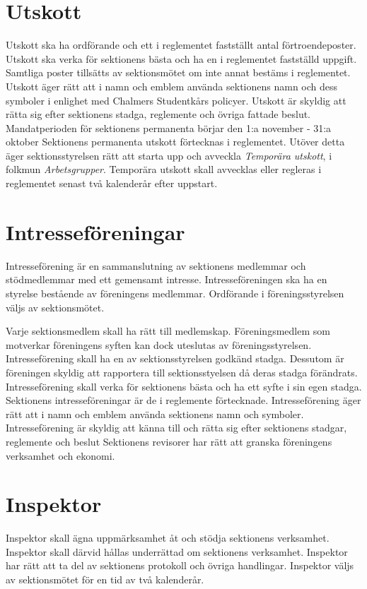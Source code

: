 \documentclass[a4paper]{dteklag}
\begin{document}
\section{Utskott}
\para Utskott ska ha ordförande och ett i reglementet fastställt antal förtroendeposter.
\para Utskott ska verka för sektionens bästa och ha en i reglementet fastställd uppgift.
\para Samtliga poster tillsätts av sektionsmötet om inte annat bestäms i reglementet. 
\para Utskott äger rätt att i namn och emblem använda sektionens namn och dess symboler i enlighet med Chalmers Studentkårs policyer.
\para Utskott är skyldig att rätta sig efter sektionens stadga, reglemente och övriga fattade beslut.
\para Mandatperioden för sektionens permanenta börjar den 1:a november - 31:a oktober
\para Sektionens permanenta utskott förtecknas i reglementet.
 Utöver detta äger sektionsstyrelsen rätt att starta upp och avveckla \textit{Temporära utskott}, i folkmun \textit{Arbetsgrupper}.
\para Temporära utskott skall avvecklas eller regleras i reglementet senast två kalenderår efter uppstart.


\section{Intresseföreningar}
\para[Definition]
Intresseförening är en sammanslutning av sektionens medlemmar och stödmedlemmar med ett gemensamt intresse. Intresseföreningen ska ha en styrelse bestående av föreningens medlemmar. Ordförande i föreningsstyrelsen väljs av sektionsmötet.

\para Varje sektionsmedlem skall ha rätt till medlemskap. Föreningsmedlem som motverkar föreningens syften kan dock uteslutas av föreningsstyrelsen.
\para Intresseförening skall ha en av sektionsstyrelsen godkänd stadga. Dessutom är föreningen skyldig att rapportera till sektionsstyelsen då deras stadga förändrats.
\para Intresseförening skall verka för sektionens bästa och ha ett syfte i sin egen stadga.
\para Sektionens intresseföreningar är de i reglemente förtecknade.
\para Intresseförening äger rätt att i namn och emblem använda sektionens namn och symboler.
\para Intresseförening är skyldig att känna till och rätta sig efter sektionens stadgar, reglemente och beslut
\para Sektionens revisorer har rätt att granska föreningens verksamhet och ekonomi.

\section{Inspektor}
\para Inspektor skall ägna uppmärksamhet åt och stödja sektionens verksamhet.
\stycke Inspektor skall därvid hållas underrättad om sektionens verksamhet.
\para Inspektor har rätt att ta del av sektionens protokoll och övriga handlingar.
\para Inspektor väljs av sektionsmötet för en tid av två kalenderår.
\end{document}
